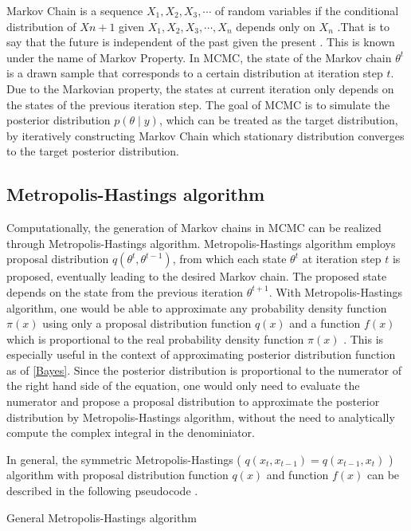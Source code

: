\documentclass{usiinftr}
\begin{document}
Markov Chain is a sequence $X_1,X_2, X_3, \cdots$ of random variables if the conditional distribution of $X{n+1}$ given $X_1,X_2, X_3, \cdots, X_n$ depends only on $X_n$ \cite{21}.That is to say that the future is independent of the past given the present \cite{21}. This is known under the name of Markov Property. In MCMC, the state of the Markov chain $\theta^{t}$ is a drawn sample that corresponds to a certain distribution at iteration step $t$. Due to the Markovian property, the states at current iteration only depends on the states of the previous iteration step. The goal of MCMC is to simulate the posterior distribution $p(\theta \mid y)$, which can be treated as the target distribution, by iteratively constructing Markov Chain which stationary distribution converges to the target posterior distribution. 


\subsection{Metropolis-Hastings algorithm}
Computationally, the generation of Markov chains in MCMC can be realized through Metropolis-Hastings algorithm. Metropolis-Hastings algorithm employs proposal distribution $q(\theta^{t},\theta^{t-1})$, from which each state $\theta^{t}$ at iteration step $t$ is proposed, eventually leading to the desired Markov chain. The proposed state depends on the state from the previous iteration $\theta^{t+1}$. With Metropolis-Hastings algorithm, one would be able to approximate any probability density function $\pi(x)$ using only a proposal distribution function $q(x)$ and a function $f(x)$ which is proportional to the real probability density function $\pi(x)$ \cite{28}.  This is especially useful in the context of approximating posterior distribution function as of \ref{Bayes}. Since the posterior distribution is proportional to the numerator of the right hand side of the equation, one would only need to evaluate the numerator and propose a proposal distribution to approximate the posterior distribution by Metropolis-Hastings algorithm, without the need to analytically compute the complex integral in the denominiator.

In general, the symmetric Metropolis-Hastings ( $q(x_t,x_{t-1}) = q(x_{t-1},x_t)$ ) algorithm with proposal distribution function $q(x)$ and function $f(x)$ can be described in the following pseudocode \cite{21}.

\begin{algorithm}
  \caption{General Metropolis-Hastings algorithm} \label{algMH}
  \begin{algorithmic}[1]
    \Statex
        \Else
        \EndIf
    \EndFor
    \State {}
    \EndFunction
  \end{algorithmic}
\end{algorithm}
\end{document}
